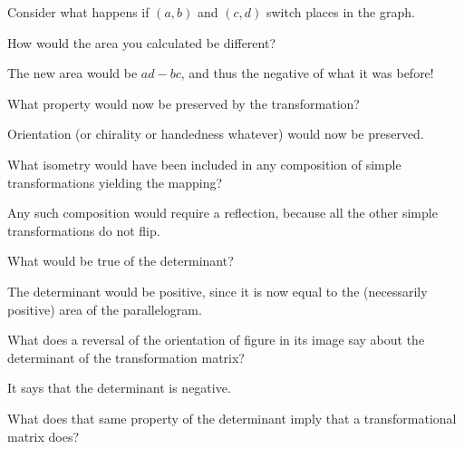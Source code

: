 \documentclass[../key.tex]{subfiles}
\begin{document}
\begin{inner_problem}
\item Consider what happens if $(a,b)$ and $(c,d)$ switch places in the graph.
\end{inner_problem}

\begin{iinner_problem}[start=1]
\item How would the area you calculated be different?
\end{iinner_problem}

The new area would be $ad-bc$, and thus the negative of what it was before!

\begin{iinner_problem}
\item What property would now be preserved by the transformation?
\end{iinner_problem}

Orientation (or chirality or handedness whatever) would now be preserved.

\begin{iinner_problem}
\item What isometry would have been included in any composition of simple transformations yielding the mapping?
\end{iinner_problem}

Any such composition would require a reflection, because all the other simple transformations do not flip.

\begin{iinner_problem}
\item What would be true of the determinant?
\end{iinner_problem}

The determinant would be positive, since it is now equal to the (necessarily positive) area of the parallelogram.

\begin{inner_problem}
\item
\end{inner_problem}

\begin{iinner_problem}[start=1]
\item What does a reversal of the orientation of figure in its image say about the determinant of the transformation matrix?
\end{iinner_problem}

It says that the determinant is negative.

\begin{iinner_problem}
\item What does that same property of the determinant imply that a transformational matrix does?
\end{iinner_problem}
\end{document}

